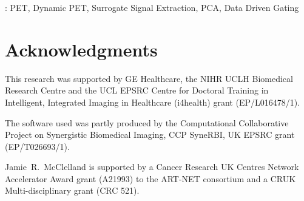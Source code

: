 \documentclass[12pt]{iopart}
\begin{document}
    : PET, Dynamic PET, Surrogate Signal Extraction, PCA, Data Driven Gating
    
    \submitto{\PMB}
    
    \maketitle
    
    

    \section*{Acknowledgments}
        This research was supported by GE Healthcare, the NIHR UCLH Biomedical Research Centre and the UCL EPSRC Centre for Doctoral Training in Intelligent, Integrated Imaging in Healthcare (i4health) grant (EP/L016478/1).
        
        The software used was partly produced by the Computational Collaborative Project on Synergistic Biomedical Imaging, CCP SyneRBI, UK EPSRC grant (EP/T026693/1).
        
        Jamie~R.~McClelland is supported by a Cancer Research UK Centres Network Accelerator Award grant (A21993) to the ART-NET consortium and a CRUK Multi-disciplinary grant (CRC 521).
    
    \printbibliography
\end{document}
